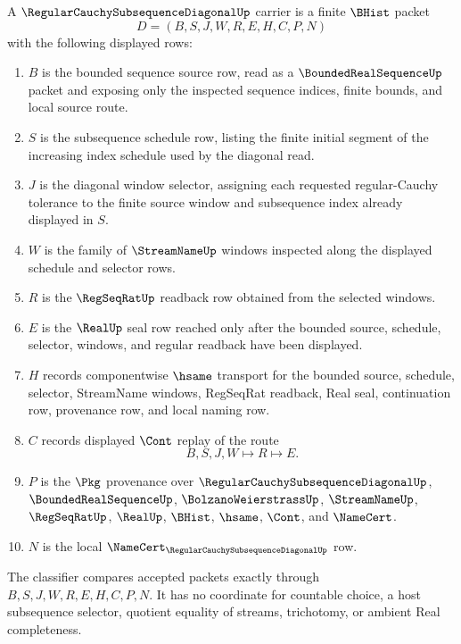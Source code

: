 \begin{definition}
\label{def:regular-cauchy-subsequence-diagonal-carrier}
A $\RegularCauchySubsequenceDiagonalUp$ carrier is a finite $\BHist$ packet
$$
D=(B,S,J,W,R,E,H,C,P,N)
$$
with the following displayed rows:
\begin{enumerate}
\item $B$ is the bounded sequence source row, read as a $\BoundedRealSequenceUp$ packet and exposing only the inspected sequence indices, finite bounds, and local source route.
\item $S$ is the subsequence schedule row, listing the finite initial segment of the increasing index schedule used by the diagonal read.
\item $J$ is the diagonal window selector, assigning each requested regular-Cauchy tolerance to the finite source window and subsequence index already displayed in $S$.
\item $W$ is the family of $\StreamNameUp$ windows inspected along the displayed schedule and selector rows.
\item $R$ is the $\RegSeqRatUp$ readback row obtained from the selected windows.
\item $E$ is the $\RealUp$ seal row reached only after the bounded source, schedule, selector, windows, and regular readback have been displayed.
\item $H$ records componentwise $\hsame$ transport for the bounded source, schedule, selector, StreamName windows, RegSeqRat readback, Real seal, continuation row, provenance row, and local naming row.
\item $C$ records displayed $\Cont$ replay of the route
$$
B,S,J,W \longmapsto R \longmapsto E .
$$
\item $P$ is the $\Pkg$ provenance over $\RegularCauchySubsequenceDiagonalUp$, $\BoundedRealSequenceUp$, $\BolzanoWeierstrassUp$, $\StreamNameUp$, $\RegSeqRatUp$, $\RealUp$, $\BHist$, $\hsame$, $\Cont$, and $\NameCert$.
\item $N$ is the local $\NameCert_{\RegularCauchySubsequenceDiagonalUp}$ row.
\end{enumerate}
The classifier compares accepted packets exactly through $B,S,J,W,R,E,H,C,P,N$. It has no coordinate for countable choice, a host subsequence selector, quotient equality of streams, trichotomy, or ambient Real completeness.
\end{definition}

